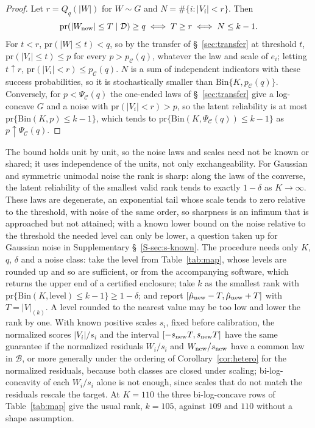 \documentclass[12pt]{article}
\theoremstyle{definition}
\newcommand{\pr}{\mathrm{pr}}
\newcommand{\B}{\mathcal{B}}
\newcommand{\E}{\mathcal{C}}
\newcommand{\Bin}{\mathrm{Bin}}
\begin{document}
\begin{proof}
Let $r = Q_q(|W|)$ for $W \sim G$ and $N = \#\{i : |V_i| < r\}$. Then
\[
\pr(|W_{\rm new}| \le T \mid \mathcal D) \ge q \iff T \ge r \iff N \le k - 1.
\]
For $t < r$, $\pr(|W| \le t) < q$, so by the transfer of \S~\ref{sec:transfer} at threshold $t$, $\pr(|V_i| \le t) \le p$ for every $p > p_{\E}(q)$, whatever the law and scale of $e_i$; letting $t \uparrow r$, $\pr(|V_i| < r) \le p_{\E}(q)$. $N$ is a sum of independent indicators with these success probabilities, so it is stochastically smaller than $\Bin\{K, p_{\E}(q)\}$. Conversely, for $p < \Psi_{\E}(q)$ the one-ended laws of \S~\ref{sec:transfer} give a log-concave $G$ and a noise with $\pr(|V_i| < r) > p$, so the latent reliability is at most $\pr\{\Bin(K, p) \le k - 1\}$, which tends to $\pr\{\Bin(K, \Psi_{\E}(q)) \le k - 1\}$ as $p \uparrow \Psi_{\E}(q)$.
\end{proof}

The bound holds unit by unit, so the noise laws and scales need not be known or shared; it uses independence of the units, not only exchangeability. For Gaussian and symmetric unimodal noise the rank is sharp: along the laws of the converse, the latent reliability of the smallest valid rank tends to exactly $1 - \delta$ as $K \to \infty$. These laws are degenerate, an exponential tail whose scale tends to zero relative to the threshold, with noise of the same order, so sharpness is an infimum that is approached but not attained; with a known lower bound on the noise relative to the threshold the needed level can only be lower, a question taken up for Gaussian noise in Supplementary \S~\ref{S-sec:s-known}. The procedure needs only $K$, $q$, $\delta$ and a noise class: take the level from Table~\ref{tab:map}, whose levels are rounded up and so are sufficient, or from the accompanying software, which returns the upper end of a certified enclosure; take $k$ as the smallest rank with $\pr\{\Bin(K, \text{level}) \le k - 1\} \ge 1 - \delta$; and report $[\hat\mu_{\rm new} - T, \hat\mu_{\rm new} + T]$ with $T = |V|_{(k)}$. A level rounded to the nearest value may be too low and lower the rank by one.
With known positive scales $s_i$, fixed before calibration, the normalized scores $|V_i|/s_i$ and the interval $[-s_{\rm new}T, s_{\rm new}T]$ have the same guarantee if the normalized residuals $W_i/s_i$ and $W_{\rm new}/s_{\rm new}$ have a common law in $\B$, or more generally under the ordering of Corollary~\ref{cor:hetero} for the normalized residuals, because both classes are closed under scaling; bi-log-concavity of each $W_i/s_i$ alone is not enough, since scales that do not match the residuals rescale the target. At $K = 110$ the three bi-log-concave rows of Table~\ref{tab:map} give the usual rank, $k = 105$, against $109$ and $110$ without a shape assumption.
\end{document}
